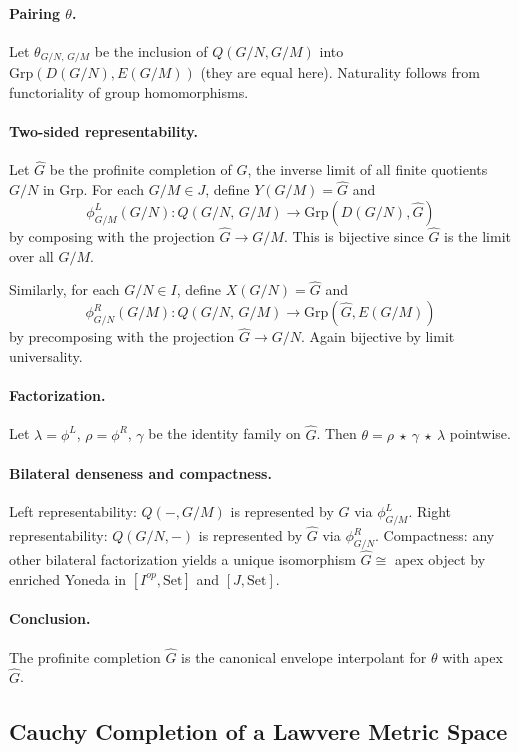 \documentclass[11pt]{article}
\theoremstyle{plain}
\theoremstyle{definition}
\theoremstyle{remark}
\newcommand{\Set}{\mathrm{Set}}
\newcommand{\Grp}{\mathrm{Grp}}
\begin{document}
\paragraph{Pairing $\theta$.}
Let $\theta_{G/N,\,G/M}$ be the inclusion of $Q(G/N,G/M)$ into
$\Grp(D(G/N),E(G/M))$ (they are equal here). Naturality follows from functoriality
of group homomorphisms.

\paragraph{Two-sided representability.}
Let $\widehat{G}$ be the profinite completion of $G$, the inverse limit of all
finite quotients $G/N$ in $\Grp$. For each $G/M \in J$, define $Y(G/M) = \widehat{G}$
and
$$
\phi^L_{G/M}(G/N) : Q(G/N,\,G/M) \to \Grp(D(G/N), \widehat{G})
$$
by composing with the projection $\widehat{G} \to G/M$. This is bijective since
$\widehat{G}$ is the limit over all $G/M$.

Similarly, for each $G/N \in I$, define $X(G/N) = \widehat{G}$ and
$$
\phi^R_{G/N}(G/M): Q(G/N,\,G/M) \to \Grp(\widehat{G},E(G/M))
$$
by precomposing with the projection $\widehat{G} \to G/N$. Again bijective by
limit universality.

\paragraph{Factorization.}
Let $\lambda=\phi^L$, $\rho=\phi^R$, $\gamma$ be the identity family on $\widehat{G}$.
Then $\theta = \rho \ \star\ \gamma \ \star\ \lambda$ pointwise.

\paragraph{Bilateral denseness and compactness.}
Left representability: $Q(-,G/M)$ is represented by $\widehat{G}$ via $\phi^L_{G/M}$.
Right representability: $Q(G/N,-)$ is represented by $\widehat{G}$ via $\phi^R_{G/N}$.
Compactness: any other bilateral factorization yields a unique isomorphism
$\widehat{G} \cong$ apex object by enriched Yoneda in $[I^{op},\Set]$ and $[J,\Set]$.

\paragraph{Conclusion.}
The profinite completion $\widehat{G}$ is the canonical envelope interpolant
for $\theta$ with apex $\widehat{G}$.

\subsection{Cauchy Completion of a Lawvere Metric Space}\label{ssec:cauchy}
\end{document}
